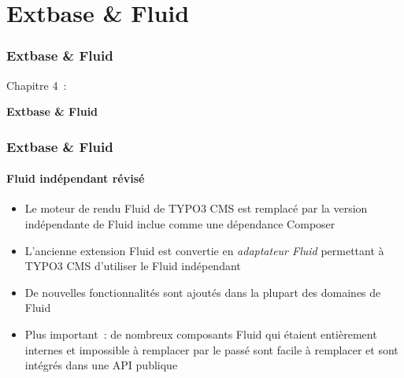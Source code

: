 %

\section{Extbase \& Fluid}
\begin{frame}[fragile]
	\frametitle{Extbase \& Fluid}

	\begin{center}\huge{Chapitre 4~:}\end{center}
	\begin{center}\huge{\color{typo3darkgrey}\textbf{Extbase \& Fluid}}\end{center}

\end{frame}


\begin{frame}[fragile]
	\frametitle{Extbase \& Fluid}
	\framesubtitle{Fluid indépendant révisé}

	\lstset{basicstyle=\tiny\ttfamily}

	\begin{itemize}

		\item Le moteur de rendu Fluid de TYPO3 CMS est remplacé par la version
			indépendante de Fluid inclue comme une dépendance Composer

		\item L'ancienne extension Fluid est convertie en \textit{adaptateur Fluid}
			permettant à TYPO3 CMS d'utiliser le Fluid indépendant

		\item De nouvelles fonctionnalités sont ajoutés dans la plupart des domaines de Fluid

		\item Plus important~: de nombreux composants Fluid qui étaient entièrement internes et
			impossible à remplacer par le passé sont facile à remplacer et sont intégrés dans
			une API publique

	\end{itemize}

\end{frame}

